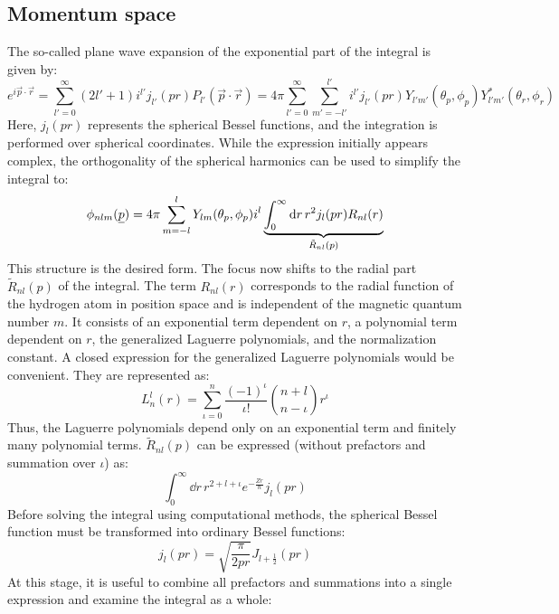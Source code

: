 \subsection*{Momentum space}
The so-called plane wave expansion \cite{Jackson:1998nia} of the exponential part of the integral is given by:
\begin{equation*}
    e^{i\vec{p}\cdot\vec{r}} = \sum_{l'=0}^\infty (2l'+1)i^{l'} j_{l'}(pr) P_{l'}(\vec{p}\cdot\vec{r}) = 4\pi\sum_{l'=0}^\infty \sum_{m'=-l'}^{l'} i^{l'} j_{l'}(pr) Y_{l'm'}(\theta_p, \phi_p) Y_{l'm'}^*(\theta_r, \phi_r)
\end{equation*}
Here, $j_l(pr)$ represents the spherical Bessel functions, and the integration is performed over spherical coordinates. 
While the expression initially appears complex, the orthogonality of the spherical harmonics can be used to simplify the integral to:
\begin{equation*}
    \phi_{nlm}(\underline{p}) = 4\pi \sum_{m=-l}^{l}Y_{lm}(\theta_p,\phi_p)i^l\underbrace{\int_{0}^{\infty}\mathrm{d} r\,r^2j_l(pr)R_{nl}(r)}_{\tilde{R}_{nl}(p)}
\end{equation*}
This structure is the desired form. The focus now shifts to the radial part $\tilde{R}_{nl}(p)$ of the integral.
The term $R_{nl}(r)$ corresponds to the radial function of the hydrogen atom in position space and is independent of the magnetic quantum number $m$.
It consists of an exponential term dependent on $r$, a polynomial term dependent on $r$, the generalized Laguerre polynomials, and the normalization constant.
A closed expression for the generalized Laguerre polynomials would be convenient. They are represented as:
\begin{equation*}
    L_n^l(r) = \sum_{\iota=0}^{n} \frac{(-1)^{\iota}}{\iota!}\binom{n+l}{n-\iota}r^{\iota}
\end{equation*}
Thus, the Laguerre polynomials depend only on an exponential term and finitely many polynomial terms.
$\tilde{R}_{nl}(p)$ can be expressed (without prefactors and summation over $\iota$) as:
\begin{equation*}
    \int_{0}^{\infty}\dd r\,r^{2+l+\iota} e^{-\frac{Zr}{n}} j_l(pr)
\end{equation*}
Before solving the integral using computational methods, the spherical Bessel function must be transformed into ordinary Bessel functions:
\begin{equation*}
    j_l(pr) = \sqrt{\frac{\pi}{2pr}}J_{l+\frac{1}{2}}(pr)
\end{equation*}
At this stage, it is useful to combine all prefactors and summations into a single expression and examine the integral as a whole:
